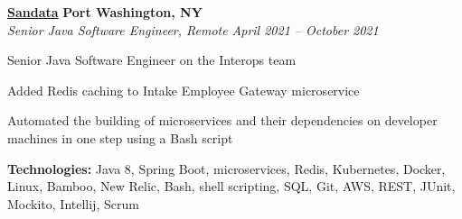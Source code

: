 %
    \headerrow
        {\textbf{\href{https://www.sandata.com/}{Sandata}}}
        {\textbf{Port Washington, NY}}
    \\
    \headerrow
        {\emph{Senior Java Software Engineer, Remote}}
        {\emph{April 2021 -- October 2021}}
    \begin{itemize*}
        \item Senior Java Software Engineer on the Interops team
        \item Added Redis caching to Intake Employee Gateway microservice
        \item Automated the building of microservices and their dependencies on developer machines in one step using a Bash script
    \end{itemize*}

    \hspace{1.0em}
        {\textbf{Technologies:} Java 8, Spring Boot, microservices, Redis, Kubernetes, Docker, Linux, Bamboo, New Relic, Bash,
        shell scripting, SQL, Git, AWS, REST, JUnit, Mockito, Intellij, Scrum}

